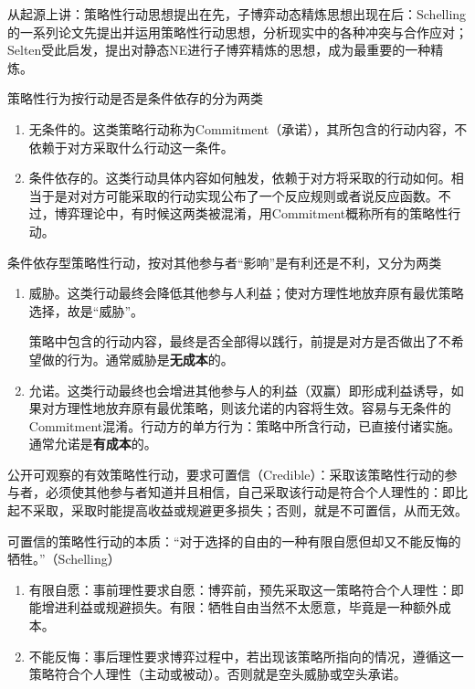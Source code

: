 \documentclass[UTF8,12pt]{ctexart}
\numberwithin{equation}{section} %
\numberwithin{figure}{section}
\numberwithin{table}{section}
\begin{document}
	从起源上讲：策略性行动思想提出在先，子博弈动态精炼思想出现在后：Schelling的一系列论文先提出并运用策略性行动思想，分析现实中的各种冲突与合作应对；Selten受此启发，提出对静态NE进行子博弈精炼的思想，成为最重要的一种精炼。
	
	策略性行为按行动是否是条件依存的分为两类
	\begin{enumerate}
		\item 无条件的。这类策略行动称为Commitment（承诺），其所包含的行动内容，不依赖于对方采取什么行动这一条件。
		
		\item 条件依存的。这类行动具体内容如何触发，依赖于对方将采取的行动如何。相当于是对对方可能采取的行动实现公布了一个反应规则或者说反应函数。不过，博弈理论中，有时候这两类被混淆，用Commitment概称所有的策略性行动。
	\end{enumerate}

	条件依存型策略性行动，按对其他参与者“影响”是有利还是不利，又分为两类
	\begin{enumerate}
		\item 威胁。这类行动最终会降低其他参与人利益；使对方理性地放弃原有最优策略选择，故是“威胁”。
		
		策略中包含的行动内容，最终是否全部得以践行，前提是对方是否做出了不希望做的行为。通常威胁是\textbf{无成本}的。
		
		\item 允诺。这类行动最终也会增进其他参与人的利益（双赢）即形成利益诱导，如果对方理性地放弃原有最优策略，则该允诺的内容将生效。容易与无条件的Commitment混淆。行动方的单方行为：策略中所含行动，已直接付诸实施。通常允诺是\textbf{有成本}的。
	\end{enumerate}
	
	公开可观察的有效策略性行动，要求可置信（Credible）：采取该策略性行动的参与者，必须使其他参与者知道并且相信，自己采取该行动是符合个人理性的：即比起不采取，采取时能提高收益或规避更多损失；否则，就是不可置信，从而无效。
	
	可置信的策略性行动的本质：“对于选择的自由的一种有限自愿但却又不能反悔的牺牲。”（Schelling）
	
	\begin{enumerate}
		\item 有限自愿：事前理性要求自愿：博弈前，预先采取这一策略符合个人理性：即能增进利益或规避损失。有限：牺牲自由当然不太愿意，毕竟是一种额外成本。
		
		\item 不能反悔：事后理性要求博弈过程中，若出现该策略所指向的情况，遵循这一策略符合个人理性（主动或被动）。否则就是空头威胁或空头承诺。
	\end{enumerate}
\end{document}
